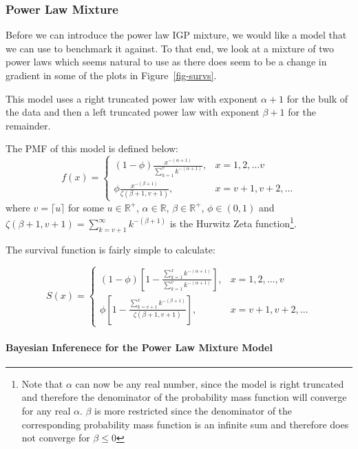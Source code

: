 \documentclass[
]{article}
\let\oldparagraph\paragraph
\renewcommand{\paragraph}[1]{\oldparagraph{#1}\mbox{}}
\begin{document}
\subsubsection{Power Law Mixture}\label{sec-plpl}

Before we can introduce the power law IGP mixture, we would like a model
that we can use to benchmark it against. To that end, we look at a
mixture of two power laws which seems natural to use as there does seem
to be a change in gradient in some of the plots in
Figure~\ref{fig-survs}.

This model uses a right truncated power law with exponent \(\alpha+1\)
for the bulk of the data and then a left truncated power law with
exponent \(\beta+1\) for the remainder.

The PMF of this model is defined below: \[
f(x) = \begin{cases}
(1-\phi)\frac{x^{-(\alpha+1)}}{\sum_{k=1}^v k^{-(\alpha+1)}}, &x=1,2,\ldots v\\
\phi\frac{x^{-(\beta+1)}}{\zeta(\beta+1, v+1)}, &x=v+1,v+2,\ldots
\end{cases}
\] where \(v=\lceil u\rceil\) for some \(u\in\mathbb{R}^+\),
\(\alpha\in\mathbb{R}\), \(\beta\in\mathbb{R}^+\), \(\phi\in(0,1)\) and
\(\zeta(\beta+1, v+1) = \sum_{k=v+1}^\infty k^{-(\beta+1)}\) is the
Hurwitz Zeta function\footnote{Note that \(\alpha\) can now be any real
  number, since the model is right truncated and therefore the
  denominator of the probability mass function will converge for any
  real \(\alpha\). \(\beta\) is more restricted since the denominator of
  the corresponding probability mass function is an infinite sum and
  therefore does not converge for \(\beta \le 0\)}.

The survival function is fairly simple to calculate:

\[
S(x) = \begin{cases}
(1-\phi)\left[1-\frac{\sum_{k=1}^x k^{-(\alpha+1)}}{\sum_{k=1}^v k^{-(\alpha+1)}}\right],&x=1,2,\ldots,v \\
\phi\left[1-\frac{\sum_{k=v+1}^x k^{-(\beta+1)}}{\zeta(\beta+1, v+1)}\right],&x=v+1,v+2,\ldots
\end{cases}
\]

\paragraph{Bayesian Inferenece for the Power Law Mixture
Model}\label{bayesian-inferenece-for-the-power-law-mixture-model}
\end{document}
